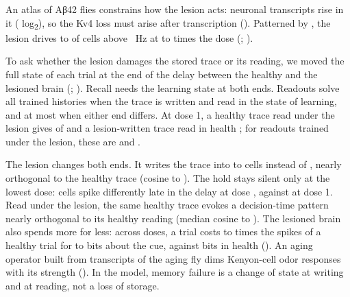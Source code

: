 An atlas of Aβ42 flies constrains how the lesion acts: neuronal  transcripts rise in it (
log\textsubscript{2}), so the Kv4 loss must arise after transcription (). Patterned by , the lesion drives
 to  of cells above ~Hz at  to  times the dose (; ).

To ask whether the lesion damages the stored trace or its reading, we moved the full state of each trial at the end of the delay
between the healthy and the lesioned brain (; ). Recall needs the learning state at both ends. Readouts solve
all  trained histories when the trace is written and read in the state of learning, and at most  when either
end differs. At dose 1, a healthy trace read under the lesion gives  of  and a lesion-written trace read in
health ; for readouts trained under the lesion, these are  and .

The lesion changes both ends. It writes the trace into  to  cells instead of , nearly orthogonal to
the healthy trace (cosine  to ). The hold stays silent only at the lowest dose:  cells spike
differently late in the delay at dose , against  at dose 1. Read under the lesion, the same healthy
trace evokes a decision-time pattern nearly orthogonal to its healthy reading (median cosine  to ). The
lesioned brain also spends more for less: across doses, a trial costs  to  times the spikes of a healthy trial for 
to  bits about the cue, against  bits in health (). An aging operator built from transcripts of the
aging fly dims Kenyon-cell odor responses with its strength (). In the model, memory failure is a
change of state at writing and at reading, not a loss of storage.
